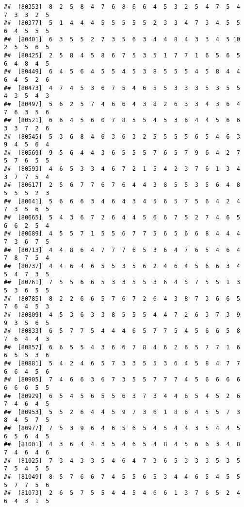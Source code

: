 \documentclass[
]{book}
\begin{document}
\begin{verbatim}
##  [80353]  8  2  5  8  4  7  6  8  6  6  4  5  3  2  5  4  7  5  4  7  3  3  2  5
##  [80377]  5  1  4  4  4  5  5  5  5  5  2  3  3  4  7  3  4  5  5  6  4  5  5  5
##  [80401]  6  3  5  5  2  7  3  5  6  3  4  4  8  4  3  3  4  5 10  2  5  5  6  5
##  [80425]  2  5  8  4  5  8  6  7  5  3  5  1  7  7  1  6  5  6  5  6  4  8  4  5
##  [80449]  6  4  5  6  4  5  5  4  5  3  8  5  5  5  4  5  8  4  4  6  4  5  2  6
##  [80473]  4  7  4  5  3  6  7  5  4  6  5  5  3  3  3  5  3  5  5  4  3  5  4  3
##  [80497]  5  6  2  5  7  4  6  6  4  3  8  2  6  3  3  4  3  6  4  7  6  3  5  6
##  [80521]  6  6  4  5  6  0  7  8  5  5  4  5  3  6  4  4  5  6  6  3  3  7  2  6
##  [80545]  5  3  6  8  4  6  3  6  3  2  5  5  5  5  6  5  4  6  3  9  4  5  6  4
##  [80569]  9  5  6  4  4  3  6  5  5  5  7  6  5  7  9  6  4  2  7  5  7  6  5  5
##  [80593]  4  6  5  3  3  4  6  7  2  1  5  4  2  3  7  6  1  3  4  3  7  7  5  4
##  [80617]  2  5  6  7  7  6  7  6  4  4  3  8  5  5  3  5  6  4  8  5  5  5  2  3
##  [80641]  5  6  6  6  3  4  6  4  3  4  5  6  5  7  5  6  4  2  4  7  3  5  6  5
##  [80665]  5  4  3  6  7  2  6  4  4  5  6  6  7  5  2  7  4  6  5  6  6  2  5  4
##  [80689]  4  5  5  7  1  5  5  6  7  7  5  6  5  6  6  8  4  4  4  7  3  6  7  5
##  [80713]  4  4  8  6  4  7  7  7  6  5  3  6  4  7  6  5  4  6  4  7  8  7  5  4
##  [80737]  4  4  6  4  6  5  5  3  5  6  2  4  6  4  5  6  6  3  4  5  4  7  3  5
##  [80761]  7  5  5  6  6  5  3  3  5  5  3  6  4  5  7  5  5  1  3  5  3  6  5  5
##  [80785]  8  2  2  6  6  5  7  6  7  2  6  4  3  8  7  3  6  6  5  7  6  4  5  3
##  [80809]  4  5  3  6  3  3  8  5  5  5  4  4  7  2  6  3  7  3  9  9  3  5  6  5
##  [80833]  6  5  7  7  5  4  4  4  6  5  7  7  5  4  5  6  6  5  8  7  6  4  4  3
##  [80857]  6  6  5  5  4  3  6  6  7  8  4  6  2  6  5  7  7  1  6  6  5  5  3  6
##  [80881]  5  4  2  4  6  5  7  3  3  5  5  3  6  4  5  8  4  7  7  6  6  4  5  6
##  [80905]  7  4  6  6  3  6  7  3  5  5  7  7  7  4  5  6  6  6  6  6  6  6  5  5
##  [80929]  6  5  4  5  6  5  5  6  3  7  3  4  4  6  5  4  5  2  6  7  4  6  4  5
##  [80953]  5  5  2  6  4  4  5  9  7  3  6  1  8  6  4  5  5  7  3  8  4  5  7  5
##  [80977]  7  5  3  9  6  4  6  5  6  5  4  5  4  4  3  5  4  4  5  6  5  6  4  5
##  [81001]  4  3  6  4  4  3  5  4  6  5  4  8  4  5  6  6  3  4  8  7  4  6  4  6
##  [81025]  7  3  4  3  3  5  4  6  4  7  3  6  5  3  3  3  5  3  5  7  5  4  5  5
##  [81049]  8  5  7  6  6  7  4  5  5  6  5  3  4  4  6  5  4  5  5  5  7  7  5  6
##  [81073]  2  6  5  7  5  5  4  4  5  4  6  6  1  3  7  6  5  2  4  6  4  3  1  5

\end{verbatim}
\end{document}
